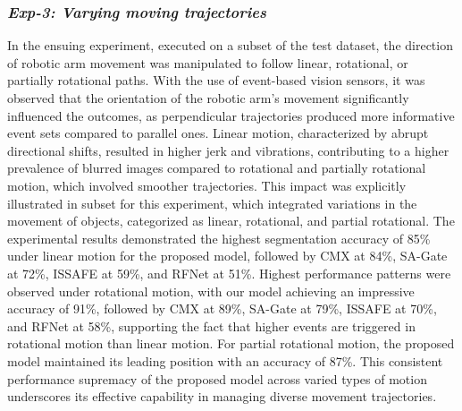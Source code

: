 \documentclass[lettersize,journal]{IEEEtran}
\begin{document}
\subsubsection{\textbf{\textit{Exp-3: Varying moving trajectories}}} 
\label{subsubsection : Trajecotries results}

In the ensuing experiment, executed on a subset of the test dataset, the direction of robotic arm movement was manipulated to follow linear, rotational, or partially rotational paths. With the use of event-based vision sensors, it was observed that the orientation of the robotic arm's movement significantly influenced the outcomes, as perpendicular trajectories produced more informative event sets compared to parallel ones. Linear motion, characterized by abrupt directional shifts, resulted in higher jerk and vibrations, contributing to a higher prevalence of blurred images compared to rotational and partially rotational motion, which involved smoother trajectories. This impact was explicitly illustrated in subset for this experiment, which integrated variations in the movement of objects, categorized as linear, rotational, and partial rotational. The experimental results demonstrated the highest segmentation accuracy of 85\% under linear motion for the proposed model, followed by CMX at 84\%, SA-Gate at 72\%, ISSAFE at 59\%, and RFNet at 51\%. Highest performance patterns were observed under rotational motion, with our model achieving an impressive accuracy of 91\%, followed by CMX at 89\%, SA-Gate at 79\%, ISSAFE at 70\%, and RFNet at 58\%, supporting the fact that higher events are triggered in rotational motion than linear motion. For partial rotational motion, the proposed model maintained its leading position with an accuracy of 87\%. This consistent performance supremacy of the proposed model across varied types of motion underscores its effective capability in managing diverse movement trajectories.
\end{document}

